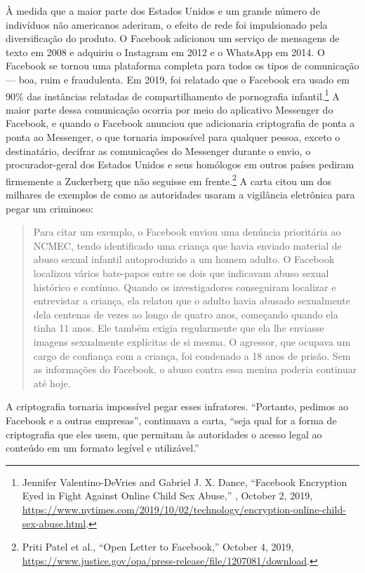 À medida que a maior parte dos Estados Unidos e um grande número de indivíduos não americanos
aderiram, o efeito de rede foi impulsionado pela diversificação do produto. O Facebook adicionou
um serviço de mensagens de texto em 2008 e adquiriu o Instagram em 2012 e o WhatsApp em 2014. O
Facebook se tornou uma plataforma completa para todos os tipos de comunicação --- boa, ruim e
fraudulenta. Em 2019, foi relatado que o Facebook era usado em 90\% das instâncias relatadas de
compartilhamento de pornografia infantil.\footnote{Jennifer Valentino-DeVries and Gabriel J. X. Dance,
``Facebook Encryption Eyed in Fight Against Online Child Sex Abuse,'' ,
October 2, 2019, \url{https://www.nytimes.com/2019/10/02/technology/encryption-online-child-sex-abuse.html}.}
A maior parte dessa comunicação ocorria por meio do aplicativo Messenger do Facebook, e quando o
Facebook anunciou que adicionaria criptografia de ponta a ponta ao Messenger, o que tornaria
impossível para qualquer pessoa, exceto o destinatário, decifrar as comunicações do Messenger
durante o envio, o procurador-geral dos Estados Unidos e seus homólogos em outros países pediram
firmemente a Zuckerberg que não seguisse em frente.\footnote{Priti Patel et al., ``Open Letter to
Facebook,'' October 4, 2019, \url{https://www.justice.gov/opa/press-release/file/1207081/download}.}
A carta citou um dos milhares de exemplos de como as autoridades usaram a vigilância eletrônica
para pegar um criminoso:

\begin{quote}
    Para citar um exemplo, o Facebook enviou uma denúncia prioritária ao NCMEC, tendo identificado
    uma criança que havia enviado material de abuso sexual infantil autoproduzido a um homem
    adulto. O Facebook localizou vários bate-papos entre os dois que indicavam abuso sexual
    histórico e contínuo. Quando os investigadores conseguiram localizar e entrevistar a criança,
    ela relatou que o adulto havia abusado sexualmente dela centenas de vezes ao longo de quatro
    anos, começando quando ela tinha 11 anos. Ele também exigia regularmente que ela lhe enviasse
    imagens sexualmente explícitas de si mesma. O agressor, que ocupava um cargo de confiança com
    a criança, foi condenado a 18 anos de prisão. Sem as informações do Facebook, o abuso contra
    essa menina poderia continuar até hoje.
\end{quote}

A criptografia tornaria impossível pegar esses infratores. ``Portanto, pedimos ao Facebook e a
outras empresas'', continuava a carta, ``seja qual for a forma de criptografia que eles usem, que
permitam às autoridades o acesso legal ao conteúdo em um formato legível e utilizável.''

